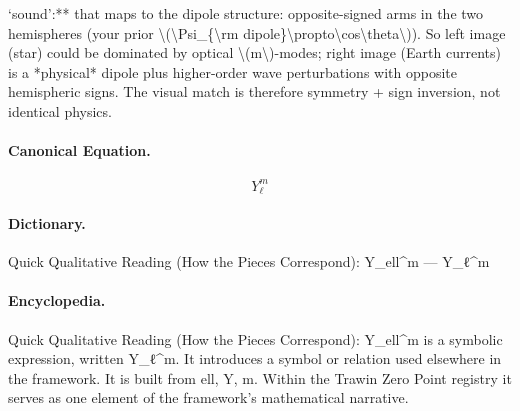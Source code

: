 ‘sound’:** that maps to the dipole structure: opposite-signed arms in the two hemispheres (your prior \textbackslash{}(\textbackslash{}Psi\_\{\textbackslash{}rm dipole\}\textbackslash{}propto\textbackslash{}cos\textbackslash{}theta\textbackslash{})). So left image (star) could be dominated by optical \textbackslash{}(m\textbackslash{})-modes; right image (Earth currents) is a *physical* dipole plus higher-order wave perturbations with opposite hemispheric signs. The visual match is therefore symmetry + sign inversion, not identical physics.

\paragraph{Canonical Equation.}
\[
Y_\ell^m
\]

\paragraph{Dictionary.}
Quick Qualitative Reading (How the Pieces Correspond): Y\_ell\textasciicircum{}m — Y\_ℓ\textasciicircum{}m

\paragraph{Encyclopedia.}
Quick Qualitative Reading (How the Pieces Correspond): Y\_ell\textasciicircum{}m is a symbolic expression, written Y\_ℓ\textasciicircum{}m. It introduces a symbol or relation used elsewhere in the framework. It is built from ell, Y, m. Within the Trawin Zero Point registry it serves as one element of the framework's mathematical narrative.
